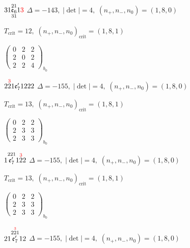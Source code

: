 \documentclass[10pt]{article}
\begin{document}
\smallskip

$31\overset{21}{\underset{31}{\mathfrak{e}_6}}1\textcolor{red}{3}$ \quad $\Delta=-143,\; |\det|=4,\; (n_+,n_-,n_0)=(1,8,0)$

\hspace{1em}$T_{\text{crit}}=12,\; (n_+,n_-,n_0)_{\text{crit}}=(1,8,1)$

\hspace{2em}$\left(\begin{smallmatrix}0 & 2 & 2 \\ 2 & 0 & 2 \\ 2 & 2 & 4\end{smallmatrix}\right)_{\!b_0}$

\smallskip

$2\overset{\textcolor{red}{3}}{2}1\mathfrak{e}_7'1222$ \quad $\Delta=-155,\; |\det|=4,\; (n_+,n_-,n_0)=(1,8,0)$

\hspace{1em}$T_{\text{crit}}=13,\; (n_+,n_-,n_0)_{\text{crit}}=(1,8,1)$

\hspace{2em}$\left(\begin{smallmatrix}0 & 2 & 2 \\ 2 & 3 & 3 \\ 2 & 3 & 3\end{smallmatrix}\right)_{\!b_0}$

\smallskip

$1\overset{221}{\mathfrak{e}_7'}1\overset{\textcolor{red}{3}}{2}2$ \quad $\Delta=-155,\; |\det|=4,\; (n_+,n_-,n_0)=(1,8,0)$

\hspace{1em}$T_{\text{crit}}=13,\; (n_+,n_-,n_0)_{\text{crit}}=(1,8,1)$

\hspace{2em}$\left(\begin{smallmatrix}0 & 2 & 2 \\ 2 & 3 & 3 \\ 2 & 3 & 3\end{smallmatrix}\right)_{\!b_0}$

\smallskip

$21\overset{2\overset{\textcolor{red}{3}}{2}1}{\mathfrak{e}_7'}12$ \quad $\Delta=-155,\; |\det|=4,\; (n_+,n_-,n_0)=(1,8,0)$
\end{document}
